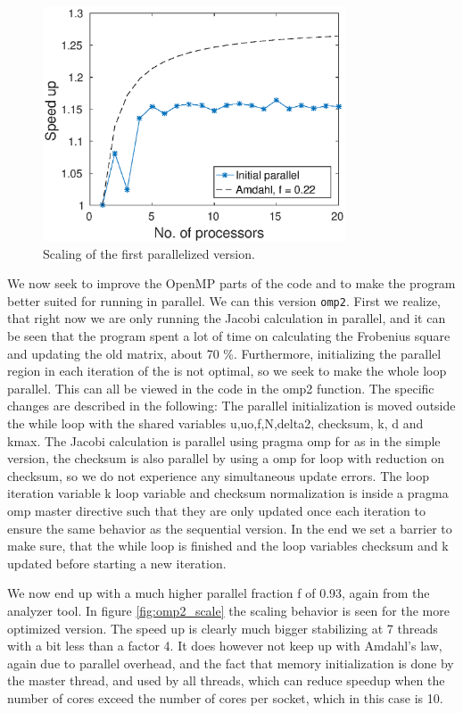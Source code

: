 \begin{figure}[h!]
\centering
\includegraphics[width = 0.8\textwidth]{fig/speedup_omp.eps}
\caption{Scaling of the first parallelized version.}
\label{fig:omp_scale1}
\end{figure}

We now seek to improve the OpenMP parts of the code and to make the program better suited for running in parallel. We can this version \texttt{omp2}. First we realize, that right now we are only running the Jacobi calculation in parallel, and it can be seen that the program spent a lot of time on calculating the Frobenius square and updating the old matrix, about 70 \%. Furthermore, initializing the parallel region in each iteration of the is not optimal, so we seek to make the whole loop parallel. This can all be viewed in the code in the omp2 function. The specific changes are described in the following: The parallel initialization is moved outside the while loop with the shared variables u,uo,f,N,delta2, checksum, k, d and kmax. The Jacobi calculation is parallel using pragma omp for as in the simple version, the checksum is also parallel by using a omp for loop with reduction on checksum, so we do not experience any simultaneous update errors. The loop iteration variable k loop variable and checksum normalization is inside a pragma omp master directive such that they are only updated once each iteration to ensure the same behavior as the sequential version. In the end we set a barrier to make sure, that the while loop is finished and the loop variables checksum and k updated before starting a new iteration.

We now end up with a much higher parallel fraction f of 0.93, again from the analyzer tool. In figure \ref{fig:omp2_scale} the scaling behavior is seen for the more optimized version. The speed up is clearly much bigger stabilizing at 7 threads with a bit less than a factor 4. It does however not keep up with Amdahl's law, again due to parallel overhead, and the fact that memory initialization is done by the master thread, and used by all threads, which can reduce speedup when the number of cores exceed the number of cores per socket, which in this case is 10.


